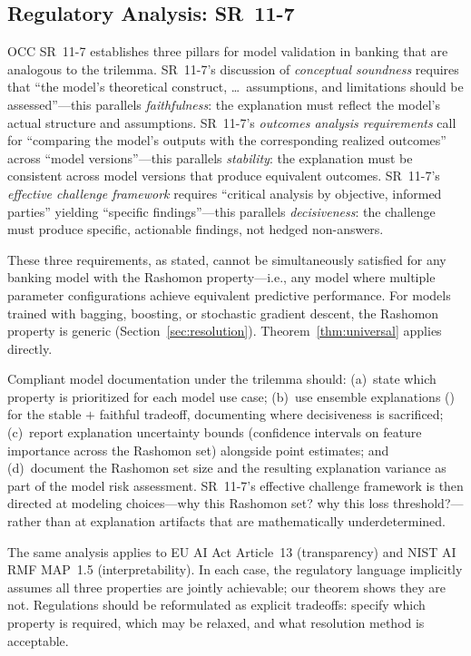 
\subsection{Regulatory Analysis: SR~11-7}
\label{sec:regulatory-analysis}

OCC SR~11-7 \citep{occ2011sr117} establishes three pillars for model
validation in banking that are analogous to the trilemma.
SR~11-7's discussion of \emph{conceptual soundness} requires that ``the
model's theoretical construct, \ldots\ assumptions, and limitations should
be assessed''---this parallels \emph{faithfulness}: the explanation must
reflect the model's actual structure and assumptions.
SR~11-7's \emph{outcomes analysis requirements} call for ``comparing the
model's outputs with the corresponding realized outcomes'' across ``model
versions''---this parallels \emph{stability}: the explanation must be
consistent across model versions that produce equivalent outcomes.
SR~11-7's \emph{effective challenge framework} requires ``critical analysis
by objective, informed parties'' yielding ``specific findings''---this
parallels \emph{decisiveness}: the challenge must produce specific,
actionable findings, not hedged non-answers.

These three requirements, as stated, cannot be simultaneously satisfied for
any banking model with the Rashomon property---i.e., any model where
multiple parameter configurations achieve equivalent predictive
performance. For models trained with bagging, boosting, or stochastic
gradient descent, the Rashomon property is generic
(Section~\ref{sec:resolution}). Theorem~\ref{thm:universal} applies
directly.

Compliant model documentation under the trilemma should: (a)~state which
property is prioritized for each model use case; (b)~use ensemble
explanations (\DASH{}) for the stable $+$ faithful tradeoff, documenting
where decisiveness is sacrificed; (c)~report explanation uncertainty bounds
(confidence intervals on feature importance across the Rashomon set)
alongside point estimates; and (d)~document the Rashomon set size and the
resulting explanation variance as part of the model risk assessment.
SR~11-7's effective challenge framework is then directed at modeling choices---why
this Rashomon set? why this loss threshold?---rather than at explanation
artifacts that are mathematically underdetermined.

The same analysis applies to EU AI Act Article~13 \citep{euaiact2024}
(transparency) and NIST AI RMF MAP~1.5 \citep{nistai2023}
(interpretability). In each case, the regulatory language implicitly
assumes all three properties are jointly achievable; our theorem shows they
are not. Regulations should be reformulated as explicit tradeoffs: specify
which property is required, which may be relaxed, and what resolution
method is acceptable.
